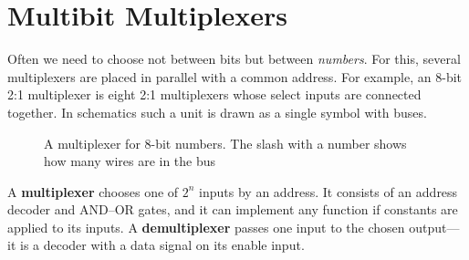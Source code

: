 \section{Multibit Multiplexers}

Often we need to choose not between bits but between \emph{numbers}. For this,
several multiplexers are placed in parallel with a common address. For example,
an 8-bit 2:1 multiplexer is eight 2:1 multiplexers whose select inputs are
connected together. In schematics such a unit is drawn as a single symbol with
buses.

\begin{figure}[H]
\centering
{}
\caption{A multiplexer for 8-bit numbers. The slash with a number shows how many
wires are in the bus}
\end{figure}

\begin{ideabox}
A \textbf{multiplexer} chooses one of $2^n$ inputs by an address. It consists of
an address decoder and AND--OR gates, and it can implement any function if
constants are applied to its inputs. A \textbf{demultiplexer} passes one input
to the chosen output---it is a decoder with a data signal on its enable input.
\end{ideabox}


